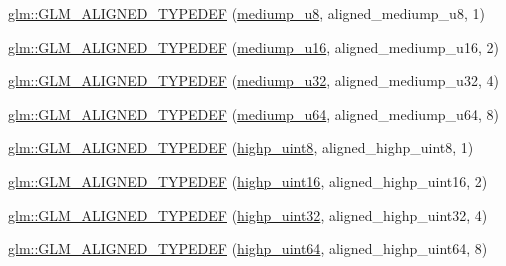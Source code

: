 \begin{DoxyCompactItemize}
\item 
\mbox{\hyperlink{group__gtx__type__aligned_gada8b996eb6526dc1ead813bd49539d1b}{glm\+::\+G\+L\+M\+\_\+\+A\+L\+I\+G\+N\+E\+D\+\_\+\+T\+Y\+P\+E\+D\+EF}} (\mbox{\hyperlink{group__gtc__type__precision_gac04b372784392e82bd557f300c4de097}{mediump\+\_\+u8}}, aligned\+\_\+mediump\+\_\+u8, 1)
\item 
\mbox{\hyperlink{group__gtx__type__aligned_ga28948f6bfb52b42deb9d73ae1ea8d8b0}{glm\+::\+G\+L\+M\+\_\+\+A\+L\+I\+G\+N\+E\+D\+\_\+\+T\+Y\+P\+E\+D\+EF}} (\mbox{\hyperlink{group__gtc__type__precision_ga6745262ef6a6fdb8637b2387ef924828}{mediump\+\_\+u16}}, aligned\+\_\+mediump\+\_\+u16, 2)
\item 
\mbox{\hyperlink{group__gtx__type__aligned_gad6a7c0b5630f89d3f1c5b4ef2919bb4c}{glm\+::\+G\+L\+M\+\_\+\+A\+L\+I\+G\+N\+E\+D\+\_\+\+T\+Y\+P\+E\+D\+EF}} (\mbox{\hyperlink{group__gtc__type__precision_gad0c27a525045c299a92306eb4cd7c13a}{mediump\+\_\+u32}}, aligned\+\_\+mediump\+\_\+u32, 4)
\item 
\mbox{\hyperlink{group__gtx__type__aligned_gaa0fc531cbaa972ac3a0b86d21ef4a7fa}{glm\+::\+G\+L\+M\+\_\+\+A\+L\+I\+G\+N\+E\+D\+\_\+\+T\+Y\+P\+E\+D\+EF}} (\mbox{\hyperlink{group__gtc__type__precision_ga00c51a16fa190b0a90205d50d6d8a44a}{mediump\+\_\+u64}}, aligned\+\_\+mediump\+\_\+u64, 8)
\item 
\mbox{\hyperlink{group__gtx__type__aligned_ga0ee829f7b754b262bbfe6317c0d678ac}{glm\+::\+G\+L\+M\+\_\+\+A\+L\+I\+G\+N\+E\+D\+\_\+\+T\+Y\+P\+E\+D\+EF}} (\mbox{\hyperlink{group__gtc__type__precision_ga2c27c6dd26e893786f04b10f99c1ee95}{highp\+\_\+uint8}}, aligned\+\_\+highp\+\_\+uint8, 1)
\item 
\mbox{\hyperlink{group__gtx__type__aligned_ga447848a817a626cae08cedc9778b331c}{glm\+::\+G\+L\+M\+\_\+\+A\+L\+I\+G\+N\+E\+D\+\_\+\+T\+Y\+P\+E\+D\+EF}} (\mbox{\hyperlink{group__gtc__type__precision_ga4d32967d45ba8365e2a05eaaac85e978}{highp\+\_\+uint16}}, aligned\+\_\+highp\+\_\+uint16, 2)
\item 
\mbox{\hyperlink{group__gtx__type__aligned_ga6027ae13b2734f542a6e7beee11b8820}{glm\+::\+G\+L\+M\+\_\+\+A\+L\+I\+G\+N\+E\+D\+\_\+\+T\+Y\+P\+E\+D\+EF}} (\mbox{\hyperlink{group__gtc__type__precision_ga3145e44c73e2df7dfe4f3cb65974bf22}{highp\+\_\+uint32}}, aligned\+\_\+highp\+\_\+uint32, 4)
\item 
\mbox{\hyperlink{group__gtx__type__aligned_ga2aca46c8608c95ef991ee4c332acde5f}{glm\+::\+G\+L\+M\+\_\+\+A\+L\+I\+G\+N\+E\+D\+\_\+\+T\+Y\+P\+E\+D\+EF}} (\mbox{\hyperlink{group__gtc__type__precision_ga8079c653e20cda03d34b99de629a7b09}{highp\+\_\+uint64}}, aligned\+\_\+highp\+\_\+uint64, 8)

\end{DoxyCompactItemize}
